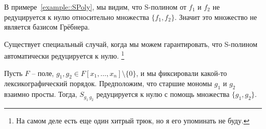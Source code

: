 \begin{remark}
В примере~\ref{example::SPoly}, мы видим, что S-полином от $f_1$ и $f_2$ не редуцируется к нулю относительно множества $\{f_1, f_2\}$.
Значит это множество не является базисом Грёбнера.
\end{remark}

Существует специальный случай, когда мы можем гарантировать, что S-полином автоматически редуцируется к нулю.%
\footnote{На самом деле есть еще один хитрый трюк, но я его упоминать не буду.}

\begin{claim}
\label{claim::CoprimeLeadingMonomials}
Пусть $F$ -- поле, $g_1,g_2\in F[x_1,\ldots,x_n]\setminus\{0\}$, и мы фиксировали какой-то лексикографический порядок.
Предположим, что старшие мономы $g_1$ и $g_2$ взаимно просты.
Тогда, $S_{g_1\,g_2}$ редуцируется к нулю с помощь множества $\{g_1,g_2\}$.
\end{claim}
